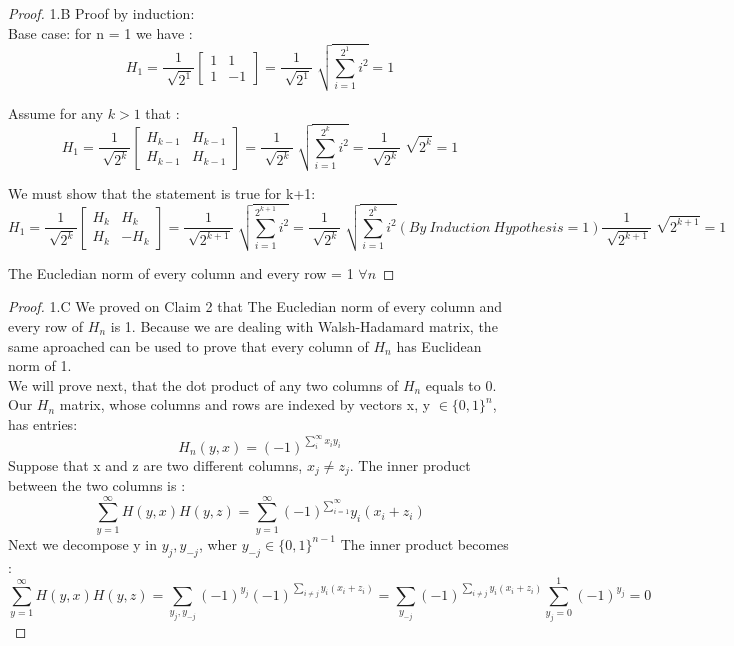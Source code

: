 \documentclass[11 pt]{article}
\begin{document}
\begin{proof}
1.B Proof by induction:\\
Base case: for n = 1 we have :
\[
H_1 = \frac{1}{\sqrt[]{2^1}}
\begin{bmatrix}
1 & 1\\
1 & -1
\end{bmatrix}
= 
\frac{1}{\sqrt[]{2^1}} \sqrt[]{\sum_{i=1} ^{2^1} i^2 }
= 1
\]

Assume for any $k>1$ that : 
\[
H_1 = \frac{1}{\sqrt[]{2^k}}
\begin{bmatrix}
H_{k-1} & H_{k-1}\\
H_{k-1} & H_{k-1}
\end{bmatrix}
= 
\frac{1}{\sqrt[]{2^k}} \sqrt[]{\sum_{i=1} ^{2^k} i^2 }
= 
\frac{1}{\sqrt[]{2^k}} \sqrt[]{2^k}
=1
\]

We must show that the statement is true for k+1:
\[
H_1 = \frac{1}{\sqrt[]{2^k}}
\begin{bmatrix}
H_{k} & H_{k}\\
H_{k} & -H_{k}
\end{bmatrix}
= 
\frac{1}{\sqrt[]{2^{k+1}}} \sqrt[]{\sum_{i=1} ^{2^{k+1}} i^2 }
=   
\frac{1}{\sqrt[]{2^{k}}} \sqrt[]{\sum_{i=1} ^{2^{k}} i^2 } (By \ Induction \  Hypothesis = 1)  \frac{1}{\sqrt[]{2^{k+1}}} \sqrt[]{2^{k+1} } = 1
\]

The Eucledian norm of every column and every row = 1 $\forall n$
\end{proof}

\begin{proof}

1.C We proved on Claim 2 that The Eucledian norm of every column and every row of $H_n$ is 1. Because we are dealing with Walsh-Hadamard matrix, the same aproached can be used to prove that every column of $H_n$ has Euclidean norm of 1.\\
We will prove next, that the dot product of any two columns of $H_n$ equals to 0.\\
Our $H_n$ matrix, whose columns and rows are indexed by vectors x, y $\in \{0,1\}^n $, has entries: $$H_n(y,x) = (-1)^{\sum_{i}^{\infty}x_iy_i}$$
Suppose that x and z are two different columns, $x_j \ne z_j$. The inner product between the two columns is :
$$   \sum_{y=1}^{\infty}H(y,x) H(y,z) = \sum_{y=1}^ {\infty} (-1)^{\sum_{i=1}^{\infty}}y_i(x_i+z_i)$$
Next we decompose y in $y_j, y_{-j}$, wher $y_{-j} \in \{0,1\}^{n-1}$ The inner product becomes :
$$  \sum_{y=1}^{\infty}H(y,x) H(y,z) =   \sum_{y_j,y_{-j}} (-1)^{y_j}(-1)^{\sum_{i \ne j}y_i(x_i+z_i) } = \sum_{y_{-j}}(-1)^{\sum_{i \ne j}y_i(x_i+z_i) } \sum_{y_j= 0}^{1}(-1)^{y_j} = 0$$ 
\end{proof}
\end{document}
